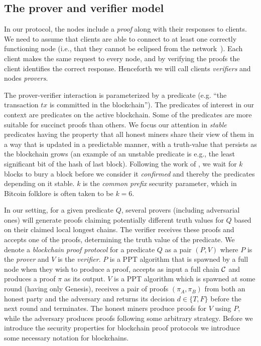 \subsection{The prover and verifier model}
In our protocol, the nodes include a \emph{proof} along with their responses to
clients. We need to assume that clients are able to connect to at least one
correctly functioning node (i.e., that they cannot be eclipsed from the
network~\cite{heilman2015eclipse,hijackingbitcoin}). Each client makes the same
request to every node, and by verifying the proofs the client identifies the
correct response. Henceforth we will call clients \emph{verifiers} and nodes
\emph{provers}.

The prover-verifier interaction is parameterized by a predicate (e.g. ``the
transaction $tx$ is committed in the blockchain'').
%
The predicates of interest in our context are predicates on the active
blockchain. Some of the predicates are more suitable for succinct proofs than
others. We focus our attention in \emph{stable} predicates having the property
that all honest miners share their view of them in a way that is updated in a
predictable manner, with a truth-value that persists as the blockchain grows (an
example of an unstable predicate is e.g., the least significant bit of the hash
of last block). Following the work of \cite{backbone}, we wait for $k$ blocks to
bury a block before we consider it \emph{confirmed} and thereby the predicates
depending on it stable. $k$ is the \emph{common prefix} security parameter,
which in Bitcoin folklore is often taken to be $k = 6$.

In our setting, for a given predicate $Q$, several  provers (including
adversarial ones) will generate proofs claiming potentially different truth
values for $Q$ based on their claimed local longest chains. The verifier
receives these proofs and accepts one of the proofs, determining the truth value
of the predicate.  We denote a  \emph{blockchain proof protocol} for a
predicate $Q$ as a pair $(P, V)$ where $P$ is the \emph{prover} and $V$ is the
\emph{verifier}. $P$ is a PPT algorithm that is spawned by a full node when
they wish to produce a proof, accepts as input a full chain $\mathcal{C}$ and
produces a proof $\pi$ as its output. $V$ is a PPT algorithm which is spawned at
some round (having only Genesis), receives a pair of proofs $(\pi_A, \pi_B)$
from both an honest party and the adversary and returns its decision $d \in \{T,
F\}$ before the next round and terminates. The honest miners produce proofs for
$V$ using $P$, while the adversary produces proofs following some arbitrary
strategy. Before we introduce the security properties for blockchain proof
protocols we introduce some necessary notation for blockchains.

